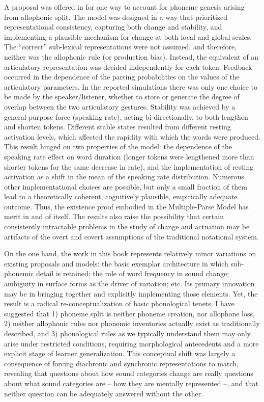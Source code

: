 A proposal was offered in  for one
way to account for phoneme genesis arising from allophonic split.
The model was designed in a way that prioritized representational
consistency, capturing both change and stability, and implementing
a plausible mechanism for change at both local and global scales.
The “correct” sub-lexical representations were not assumed,
and therefore, neither was the allophonic rule (or production bias).
Instead, the equivalent of an articulatory representation was decided
independently for each token. Feedback occurred in the dependence
of the parsing probabilities on the values of the articulatory parameters.
In the reported simulations there was only one choice to be made by
the speaker/listener, whether to store or generate the degree of overlap
between the two articulatory gestures. Stability was achieved by a
general-purpose force (speaking rate), acting bi-directionally, to
both lengthen and shorten tokens. Different stable states resulted
from different resting activation levels, which affected the rapidity
with which the words were produced. This result hinged on two properties
of the model: the dependence of the speaking rate effect on word duration
(longer tokens were lengthened more than shorter tokens for the same
decrease in rate), and the implementation of resting activation as
a shift in the mean of the speaking rate distribution. Numerous other
implementational choices are possible, but only a small fraction of
them lead to a theoretically coherent, cognitively plausible, empirically
adequate outcome. Thus, the existence proof embodied in the Multiple-Parse
Model has merit in and of itself. The results also raise the possibility
that certain consistently intractable problems in the study of change
and actuation may be artifacts of the overt and covert assumptions
of the traditional notational system.

On the one hand, the work in this book represents relatively minor
variations on existing proposals and models: the basic exemplar architecture
in which sub-phonemic detail is retained; the role of word frequency
in sound change; ambiguity in surface forms as the driver of variation;
etc. Its primary innovation may be in bringing together and explicitly
implementing those elements. Yet, the result is a radical re-conceptualization
of basic phonological tenets. I have suggested that 1) phoneme split is neither phoneme
creation, nor allophone loss, 2) neither allophonic rules
nor phonemic inventories actually exist as traditionally described, and 3) phonological
rules as we typically understand them may only arise under restricted
conditions, requiring morphological antecedents and a more explicit
stage of learner generalization. This conceptual shift was largely
a consequence of forcing diachronic and synchronic representations
to match, revealing that questions about how sound categories change
are really questions about what sound categories are – how they are
mentally represented –, and that neither question can be adequately
answered without the other.
